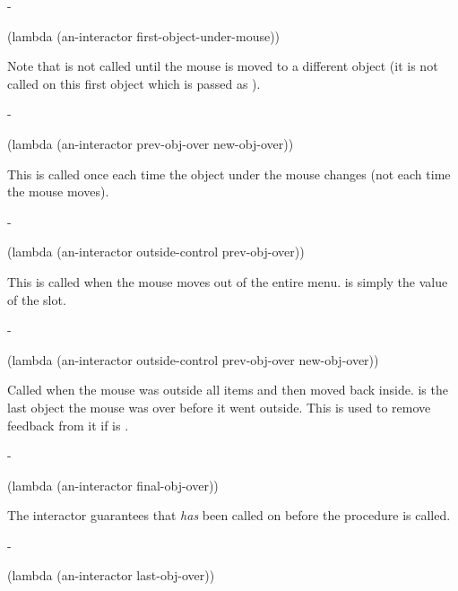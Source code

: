\begin{description}

 -
\begin{programinlist}
(lambda (an-interactor first-object-under-mouse))
\end{programinlist}
Note that  is not called until the
mouse is moved to a different object (it is not called on this first object
which is passed as ).



 -
\begin{programinlist}
(lambda (an-interactor prev-obj-over new-obj-over))
\end{programinlist}
This is called once each time the object under the mouse changes (not each
time the mouse moves).



 -
\begin{programinlist}
(lambda (an-interactor outside-control prev-obj-over))
\end{programinlist}
This is called when the mouse moves out of the entire menu.
 is simply the value of the  slot.



 -
\begin{programinlist}
(lambda (an-interactor outside-control prev-obj-over new-obj-over))
\end{programinlist}
Called when the mouse was outside all items and then moved back inside.
 is the last object the mouse was over before it went
outside.  This is used to remove feedback from it if  is
.



 -
\begin{programinlist}
(lambda (an-interactor final-obj-over))
\end{programinlist}
The interactor guarantees that  {\it has} been called on
 before the  procedure is called.



 -
\begin{programinlist}
(lambda (an-interactor last-obj-over))
\end{programinlist}

\end{description}


